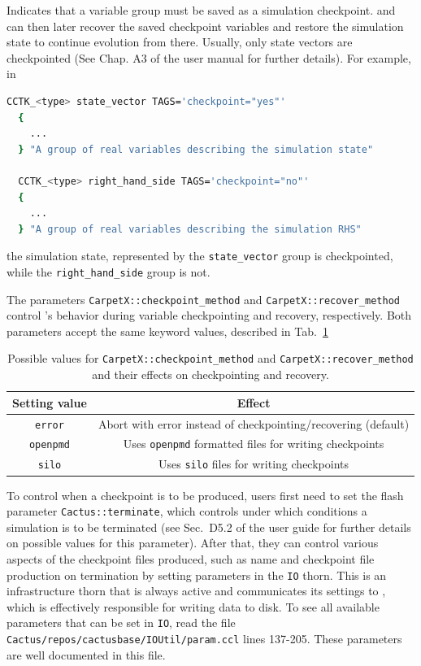Indicates that a variable group must be saved as a simulation checkpoint. \Cactus\space and \CarpetX\space can then later recover the saved checkpoint variables and restore the simulation state to continue evolution from there. Usually, only state vectors are checkpointed (See Chap. A3 of the \Cactus user manual for further details). For example, in
%
\begin{lstlisting}[language=bash]
  CCTK_<type> state_vector TAGS='checkpoint="yes"'
  {
    ...
  } "A group of real variables describing the simulation state"

  CCTK_<type> right_hand_side TAGS='checkpoint="no"'
  {
    ...
  } "A group of real variables describing the simulation RHS"
\end{lstlisting}
%
the simulation state, represented by the \texttt{state\_vector} group is checkpointed, while the \texttt{right\_hand\_side} group is not.

The parameters \texttt{CarpetX::checkpoint\_method} and \texttt{CarpetX::recover\_method} control \CarpetX's behavior during variable checkpointing and recovery, respectively. Both parameters accept the same keyword values, described in Tab.~\ref{tab:checkpoint_recovery}

\begin{table}[hb]
  \centering
  \begin{tabular}{cc}
  Setting value    & Effect                                                         \\ \hline\hline
  \texttt{error}   & Abort with error instead of checkpointing/recovering (default) \\
  \texttt{openpmd} & Uses \texttt{openpmd} formatted files for writing checkpoints  \\
  \texttt{silo}    & Uses \texttt{silo} files for writing checkpoints               \\ \hline\hline
  \end{tabular}
  \caption{Possible values for \texttt{CarpetX::checkpoint\_method} and \texttt{CarpetX::recover\_method} and their effects on checkpointing and recovery.}
  \label{tab:checkpoint_recovery}
\end{table}


To control when a checkpoint is to be produced, users first need to set the flash parameter \texttt{Cactus::terminate}, which controls under which conditions a simulation is to be terminated (see Sec.~D5.2 of the \Cactus\space user guide for further details on possible values for this parameter). After that, they can control various aspects of the checkpoint files produced, such as name and checkpoint file production on termination by setting parameters in the \texttt{IO} thorn. This is an infrastructure thorn that is always active and communicates its settings to \CarpetX, which is effectively responsible for writing data to disk. To see all available parameters that can be set in \texttt{IO}, read the file \texttt{Cactus/repos/cactusbase/IOUtil/param.ccl} lines 137-205. These parameters are well documented in this file. 

